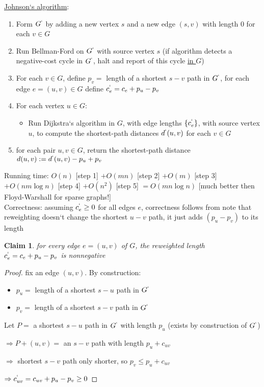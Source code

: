 \documentclass[a4paper,12pt]{article}
\theoremstyle{plain}
\newtheorem{claim}{Claim}
\theoremstyle{definition}
\theoremstyle{remark}
\begin{document}
\underline{Johnson`s algorithm}:
\begin{enumerate}
	\item Form $G^`$ by adding a new vertex $s$ and a new edge $(s, v)$ with length $0$ for each $v \in G$
	\item Run Bellman-Ford on $G^`$ with source vertex $s$ (if algorithm detects a negative-cost cycle in $G^`$, halt and report of this cycle \underline{in $G$})
	\item For each $v \in G$, define $p_v =$ length of a shortest $s-v$ path in $G^`$, for each edge $e = (u, v) \in G$ define $c_e^` = c_e + p_u - p_v$
	\item For each vertex $u \in G$:
	\begin{itemize}
		\item Run Dijkstra`s algorithm in $G$, with edge lengths $\{c_e^`\}$, with source vertex $u$, to compute the shortest-path distances $d^`(u, v)$ for each $v \in G$
	\end{itemize}
	\item for each pair $u, v \in G$, return the shortest-path distance $d(u, v) := d^`(u, v) - p_u + p_v$
\end{enumerate}

Running time: $O(n)$ [step 1] $+ O(mn)$ [step 2] $+ O(m)$ [step 3] $+ O(nm \log n)$ [step 4] $+ O(n^2)$ [step 5] $= O(mn \log n)$ [much better then Floyd-Warshall for sparse graphs!]
\\

Correctness: assuming $c^`_e \geq 0$ for all edges $e$, correctness follows from note that reweighting doesn`t change the shortest $u-v$ path, it just adds $(p_u - p_v)$ to its length

\begin{claim} for every edge $e = (u, v)$ of $G$, the reweighted length $c^`_e = c_e + p_u - p_v$ is nonnegative\end{claim}
\begin{proof}
fix an edge $(u, v)$. By construction:
\begin{itemize}
	\item $p_u =$ length of a shortest $s-u$ path in $G^`$
	\item $p_v =$ length of a shortest $s-v$ path in $G^`$
\end{itemize}

Let $P =$ a shortest $s-u$ path in $G^`$ with length $p_u$ (exists by construction of $G^`$)

$\Rightarrow P + (u, v) =$ an $s-v$ path with length $p_u + c_{uv}$

$\Rightarrow$ shortest $s-v$ path only shorter, so $p_v \leq p_u + c_{uv}$

$\Rightarrow c^`_{uv} = c_{uv} + p_u - p_v \geq 0$
\end{proof}
\end{document}
